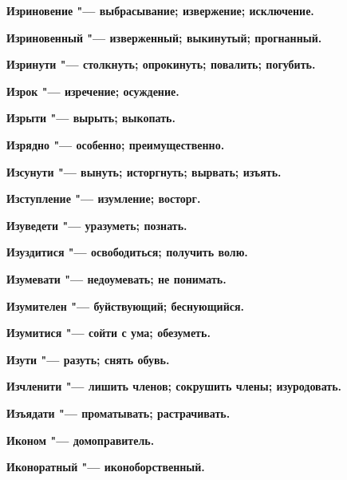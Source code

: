 \bfseries Изриновение \normalfont{} "--- выбрасывание; извержение; исключение. 




\bfseries Изриновенный \normalfont{} "--- изверженный; выкинутый; прогнанный. 




\bfseries Изринути \normalfont{} "--- столкнуть; опрокинуть; повалить; погубить. 




\bfseries Изрок \normalfont{} "--- изречение; осуждение. 




\bfseries Изрыти \normalfont{} "--- вырыть; выкопать. 




\bfseries Изрядно \normalfont{} "--- особенно; преимущественно. 




\bfseries Изсунути \normalfont{} "--- вынуть; исторгнуть; вырвать; изъять. 




\bfseries Изступление \normalfont{} "--- изумление; восторг. 




\bfseries Изуведети \normalfont{} "--- уразуметь; познать. 




\bfseries Изуздитися \normalfont{} "--- освободиться; получить волю. 




\bfseries Изумевати \normalfont{} "--- недоумевать; не понимать. 




\bfseries Изумителен \normalfont{} "--- буйствующий; беснующийся. 




\bfseries Изумитися \normalfont{} "--- сойти с ума; обезуметь. 




\bfseries Изути \normalfont{} "--- разуть; снять обувь. 




\bfseries Изчленити \normalfont{} "--- лишить членов; сокрушить члены; изуродовать. 




\bfseries Изъядати \normalfont{} "--- проматывать; растрачивать. 




\bfseries Иконом \normalfont{} "--- домоправитель. 




\bfseries Иконоратный \normalfont{} "--- иконоборственный. 




